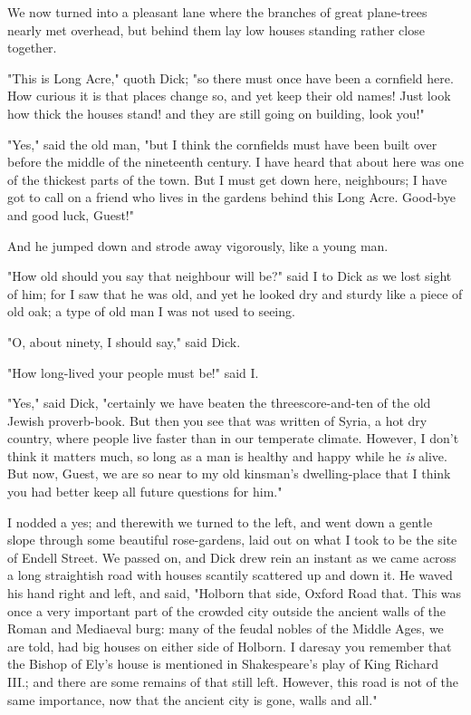 We now turned into a pleasant lane where the branches of great
plane-trees nearly met overhead, but behind them lay low houses standing
rather close together.

"This is Long Acre," quoth Dick; "so there must once have been a
cornfield here. How curious it is that places change so, and yet keep
their old names! Just look how thick the houses stand! and they are
still going on building, look you!"

"Yes," said the old man, "but I think the cornfields must have been
built over before the middle of the nineteenth century. I have heard
that about here was one of the thickest parts of the town. But I must
get down here, neighbours; I have got to call on a friend who lives in
the gardens behind this Long Acre. Good-bye and good luck, Guest!"

And he jumped down and strode away vigorously, like a young man.

"How old should you say that neighbour will be?" said I to Dick as we
lost sight of him; for I saw that he was old, and yet he looked dry and
sturdy like a piece of old oak; a type of old man I was not used to
seeing.

"O, about ninety, I should say," said Dick.

"How long-lived your people must be!" said I.

"Yes," said Dick, "certainly we have beaten the threescore-and-ten of
the old Jewish proverb-book. But then you see that was written of Syria,
a hot dry country, where people live faster than in our temperate
climate. However, I don't think it matters much, so long as a man is
healthy and happy while he \emph{is} alive. But now, Guest, we are so
near to my old kinsman's dwelling-place that I think you had better keep
all future questions for him."

I nodded a yes; and therewith we turned to the left, and went down a
gentle slope through some beautiful rose-gardens, laid out on what I
took to be the site of Endell Street. We passed on, and Dick drew rein
an instant as we came across a long straightish road with houses
scantily scattered up and down it. He waved his hand right and left, and
said, "Holborn that side, Oxford Road that. This was once a very
important part of the crowded city outside the ancient walls of the
Roman and Mediaeval burg: many of the feudal nobles of the Middle Ages,
we are told, had big houses on either side of Holborn. I daresay you
remember that the Bishop of Ely's house is mentioned in Shakespeare's
play of King Richard III.; and there are some remains of that still
left. However, this road is not of the same importance, now that the
ancient city is gone, walls and all."

